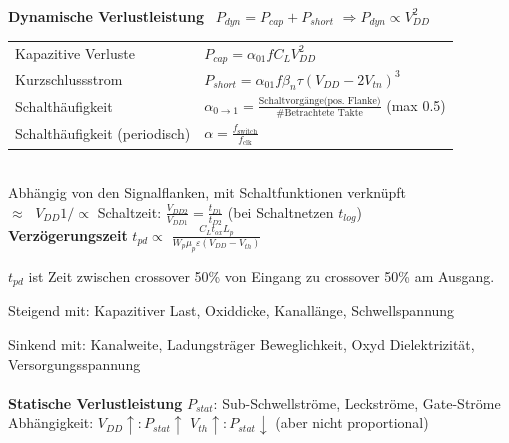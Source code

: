 \documentclass[6pt,a4paper]{scrartcl}
\renewcommand{\emph}[1]{\textsf{\textbf{#1}}}
\begin{document}
\begin{multicols*}{3}
	\\

	\emph{Dynamische Verlustleistung} \qquad \ $P_{dyn} = P_{cap} + P_{short}$ \quad $\Rightarrow P_{dyn} \propto V_{DD}^2$\\
	\begin{tabular}{ll}
		\quad Kapazitive Verluste \qquad \ \quad \ & $P_{cap} = \alpha_{01} f C_L V_{DD}^2$\\
		\quad Kurzschlussstrom	& $P_{short} = \alpha_{01} f \beta_n \tau (V_{DD} - 2V_{tn})^3$\\[0.8em]
		\quad Schalthäufigkeit & $\alpha_{0 \rightarrow 1} = \frac{\text{Schaltvorgänge(pos. Flanke)}}{\text{\# Betrachtete Takte}}$ (max 0.5)\\
		\quad Schalthäufigkeit (periodisch) & $\alpha = \frac{f_\text{switch}}{f_\text{clk}}$\\
	\end{tabular}\\
	Abhängig von den Signalflanken, mit Schaltfunktionen verknüpft\\
	$\approx \;$ $V_{DD} 1/\propto $ Schaltzeit: $\frac{V_{DD2}}{V_{DD1}} = \frac{t_{D1}}{t_{D2}}$ (bei Schaltnetzen $t_{log}$)\\
	\textbf{Verzögerungszeit} $t_{pd}\propto$ $\frac{C_Lt_{ox}L_p}{W_p\mu_p\varepsilon(V_{DD} - V_{th})}$

	$t_{pd}$ ist Zeit zwischen crossover 50\% von Eingang zu crossover 50\% am Ausgang.

	Steigend mit: Kapazitiver Last, Oxiddicke, Kanallänge, Schwellspannung

	Sinkend mit: Kanalweite, Ladungsträger Beweglichkeit, Oxyd Dielektrizität, Versorgungsspannung \\ \\
	\emph{Statische Verlustleistung} $P_{stat}$: Sub-Schwellströme, Leckströme, Gate-Ströme
	Abhängigkeit: $V_{DD}\uparrow:P_{stat}\uparrow$ \qquad $V_{th}\uparrow:P_{stat}\downarrow$ \quad (aber nicht proportional)


\end{multicols*}
\end{document}
